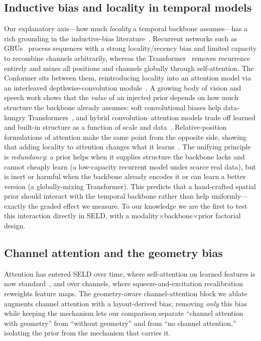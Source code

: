 \subsection{Inductive bias and locality in temporal models}
Our explanatory axis---how much \emph{locality} a temporal backbone
assumes---has a rich grounding in the inductive-bias
literature~\cite{battaglia2018relational}. Recurrent networks such as
GRUs~\cite{cho2014gru} process sequences with a strong locality/recency bias and
limited capacity to recombine channels arbitrarily, whereas the
Transformer~\cite{vaswani2017attention} removes recurrence entirely and mixes all
positions and channels globally through self-attention. The Conformer sits
between them, reintroducing locality into an attention model via an interleaved
depthwise-convolution module~\cite{gulati2020conformer}. A growing body of
vision and speech work shows that the \emph{value} of an injected prior depends
on how much structure the backbone already assumes: soft convolutional biases
help data-hungry Transformers~\cite{dascoli2021convit}, and hybrid
convolution--attention models trade off learned and built-in structure as a
function of scale and data~\cite{dai2021coatnet}. Relative-position formulations
of attention make the same point from the opposite side, showing that adding
locality to attention changes what it learns~\cite{shaw2018relative}. The
unifying principle is \emph{redundancy}: a prior helps when it supplies structure
the backbone lacks and cannot cheaply learn (a low-capacity recurrent model under
scarce real data), but is inert or harmful when the backbone already encodes it or
can learn a better version (a globally-mixing Transformer). This
predicts that a hand-crafted spatial prior should interact with the temporal
backbone rather than help uniformly---exactly the graded effect we measure. To
our knowledge we are the first to test this interaction directly in SELD, with a
modality$\times$backbone$\times$prior factorial design.

\subsection{Channel attention and the geometry bias}
Attention has entered SELD over time, where self-attention on learned
features is now standard~\cite{sudarsanam2021attention}, and over channels, where
squeeze-and-excitation recalibration~\cite{hu2018senet} reweights feature maps.
The geometry-aware channel-attention block we ablate augments channel attention
with a layout-derived bias; removing \emph{only} this bias while keeping the
mechanism lets our comparison separate ``channel attention with geometry'' from
``without geometry'' and from ``no channel attention,'' isolating the prior from
the mechanism that carries it.

